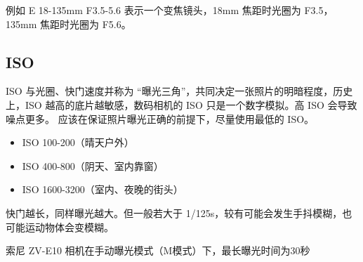 例如 E 18-135mm F3.5-5.6 表示一个变焦镜头，18mm 焦距时光圈为 F3.5， 135mm 焦距时光圈为 F5.6。

\subsection{ISO}
ISO 与光圈、快门速度并称为 “曝光三角”，共同决定一张照片的明暗程度，历史上，ISO 越高的底片越敏感，数码相机的 ISO 只是一个数字模拟。高 ISO 会导致噪点更多。 应该在保证照片曝光正确的前提下，尽量使用最低的 ISO。
\begin{itemize}
\item ISO 100-200（晴天户外）
\item ISO 400-800（阴天、室内靠窗）
\item ISO 1600-3200（室内、夜晚的街头）
\end{itemize}
快门越长，同样曝光越大。但一般若大于 1/125s，较有可能会发生手抖模糊，也可能运动物体会变模糊。


索尼 ZV-E10 相机在手动曝光模式（M模式）下，最长曝光时间为30秒
